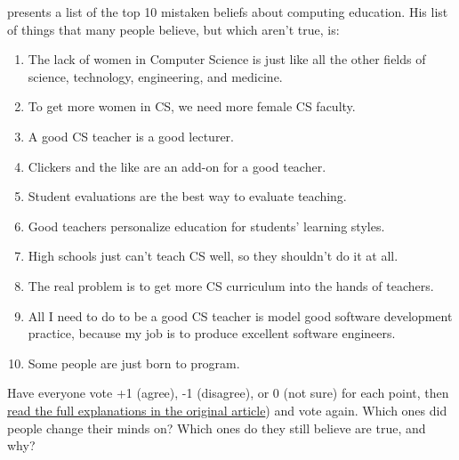 
\cite{Guzd2015b} presents a list of the top 10 mistaken beliefs about
computing education.  His list of things that many people believe, but
which aren't true, is:

\begin{enumerate}

\item
  The lack of women in Computer Science is just like all the other
  fields of science, technology, engineering, and medicine.

\item
  To get more women in CS, we need more female CS faculty.

\item
  A good CS teacher is a good lecturer.

\item
  Clickers and the like are an add-on for a good teacher.

\item
  Student evaluations are the best way to evaluate teaching.

\item
  Good teachers personalize education for students' learning styles.

\item
  High schools just can't teach CS well, so they shouldn't do it at
  all.

\item
  The real problem is to get more CS curriculum into the hands of
  teachers.

\item
  All I need to do to be a good CS teacher is model good software
  development practice, because my job is to produce excellent
  software engineers.

\item
  Some people are just born to program.

\end{enumerate}

Have everyone vote +1 (agree), -1 (disagree), or 0 (not sure) for each
point, then
\href{https://cacm.acm.org/blogs/blog-cacm/189498-top-10-myths-about-teaching-computer-science/fulltext}{read
  the full explanations in the original article}) and vote again.
Which ones did people change their minds on?  Which ones do they still
believe are true, and why?
